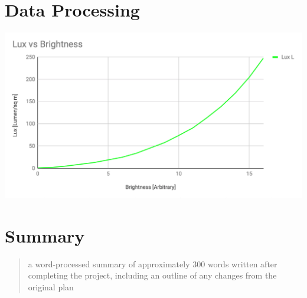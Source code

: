 \documentclass{article}
\begin{document}
\section{Data Processing}
\includegraphics[scale=0.4]{Lux_v_Brightness.jpg}

\section{Summary}
\begin{quote}
  a word-processed summary of approximately 300 words written after completing the project, including an outline of any changes from the original plan
\end{quote}
\end{document}
